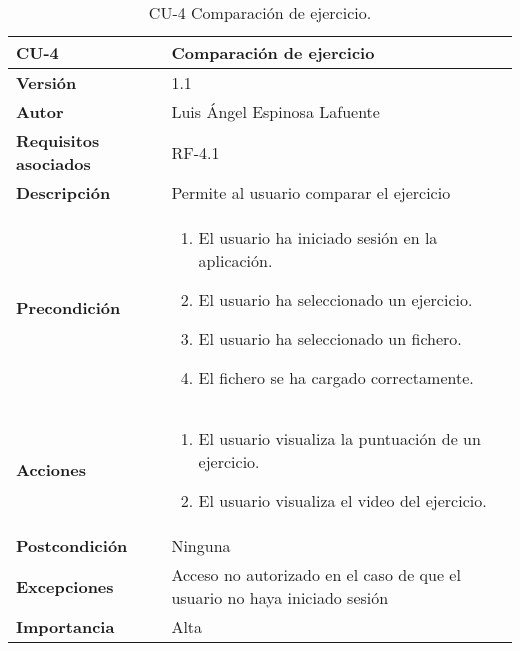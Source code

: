 \begin{table}[p]
	\centering
	\begin{tabularx}{\linewidth}{ p{} p{} }
		\toprule
		\textbf{CU-4}    & \textbf{Comparación de ejercicio}\\
		\toprule
		\textbf{Versión}              & 1.1    \\
		\textbf{Autor}                &  Luis Ángel Espinosa Lafuente \\
		\textbf{Requisitos asociados} & RF-4.1 \\
		\textbf{Descripción}          & Permite al usuario comparar el ejercicio\\
		\textbf{Precondición}     &    
		\begin{enumerate}		
			\def\labelenumi{\arabic{enumi}.}
			\tightlist
			\item El usuario ha iniciado sesión en la aplicación.
			\item El usuario ha seleccionado un ejercicio.
			\item El usuario ha seleccionado un fichero.
			\item El fichero se ha cargado correctamente.
		\end{enumerate}\\
		\textbf{Acciones}             &
		\begin{enumerate}
			\def\labelenumi{\arabic{enumi}.}
			\tightlist
			\item El usuario visualiza la puntuación de un ejercicio.
			\item El usuario visualiza el video del ejercicio.
		\end{enumerate}\\
		\textbf{Postcondición}        & Ninguna \\
		\textbf{Excepciones}          & Acceso no autorizado en el caso de que el usuario no haya iniciado sesión \\
		\textbf{Importancia}          & Alta \\
		\bottomrule
	\end{tabularx}
	\caption{CU-4 Comparación de ejercicio.}
\end{table}

